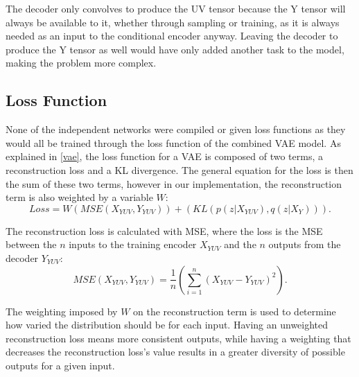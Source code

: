 \documentclass{l4proj}
\begin{document}
The decoder only convolves to produce the UV tensor because the Y tensor will always be available to it, whether through sampling or training, as it is always needed as an input to the conditional encoder anyway. Leaving the decoder to produce the Y tensor as well would have only added another task to the model, making the problem more complex.

\subsection{Loss Function}
None of the independent networks were compiled or given loss functions as they would all be trained through the loss function of the combined VAE model. As explained in \ref{vae}, the loss function for a VAE is composed of two terms, a reconstruction loss and a KL divergence. The general equation for the loss is then the sum of these two terms, however in our implementation, the reconstruction term is also weighted by a variable $W$:
\begin{equation}
    Loss =  W(MSE(X_{YUV}, Y_{YUV})) + (KL(p(z|X_{YUV}),q(z|X_{Y}))).
\end{equation}

The reconstruction loss is calculated with MSE, where the loss is the MSE between the $n$ inputs to the training encoder $X_{YUV}$ and the $n$ outputs from the decoder $Y_{YUV}$:
\begin{equation}
    MSE(X_{YUV}, Y_{YUV}) = \frac{1}{n}(\sum_{i=1}^{n} (X_{YUV} - Y_{YUV})^2).
\end{equation}

The weighting imposed by $W$ on the reconstruction term is used to determine how varied the distribution should be for each input. Having an unweighted reconstruction loss means more consistent outputs, while having a weighting that decreases the reconstruction loss's value results in a greater diversity of possible outputs for a given input.
\end{document}
